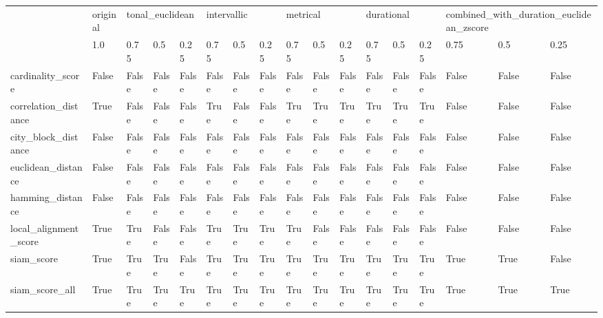 \begin{tabular}{lllllllllllllllll}
\toprule
{} & original & \multicolumn{3}{l}{tonal\_euclidean} & \multicolumn{3}{l}{intervallic} & \multicolumn{3}{l}{metrical} & \multicolumn{3}{l}{durational} & \multicolumn{3}{l}{combined\_with\_duration\_euclidean\_zscore} \\
{} & 1.0 & 0.75 & 0.5 & 0.25 & 0.75 & 0.5 & 0.25 & 0.75 & 0.5 & 0.25 & 0.75 & 0.5 & 0.25 & 0.75 & 0.5 & 0.25 \\
\midrule
cardinality\_score     & False & False & False & False & False & False & False & False & False & False & False & False & False & False & False & False \\
correlation\_distance  & True & False & False & False & True & False & False & True & True & True & True & True & True & False & False & False \\
city\_block\_distance   & False & False & False & False & False & False & False & False & False & False & False & False & False & False & False & False \\
euclidean\_distance    & False & False & False & False & False & False & False & False & False & False & False & False & False & False & False & False \\
hamming\_distance      & False & False & False & False & False & False & False & False & False & False & False & False & False & False & False & False \\
local\_alignment\_score & True & True & False & False & True & True & True & True & False & False & False & False & False & False & False & False \\
siam\_score            & True & True & True & False & True & True & True & True & True & True & True & True & True & True & True & False \\
siam\_score\_all        & True & True & True & True & True & True & True & True & True & True & True & True & True & True & True & True \\
\bottomrule
\end{tabular}

